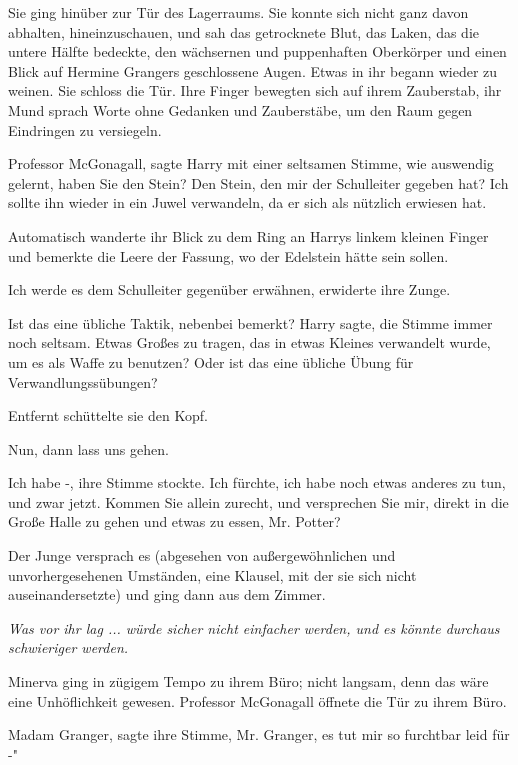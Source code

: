 Sie ging hinüber zur Tür des Lagerraums. Sie konnte sich nicht ganz davon
abhalten, hineinzuschauen, und sah das getrocknete Blut, das Laken, das die
untere Hälfte bedeckte, den wächsernen und puppenhaften Oberkörper und einen
Blick auf Hermine Grangers geschlossene Augen. Etwas in ihr begann wieder zu
weinen. Sie schloss die Tür. Ihre Finger bewegten sich auf ihrem Zauberstab, ihr
Mund sprach Worte ohne Gedanken und Zauberstäbe, um den Raum gegen Eindringen zu
versiegeln.

\glqq Professor McGonagall\grqq{}, sagte Harry mit einer seltsamen Stimme, wie
auswendig gelernt, \glqq haben Sie den Stein? Den Stein, den mir der Schulleiter
gegeben hat? Ich sollte ihn wieder in ein Juwel verwandeln, da er sich als
nützlich erwiesen hat.\grqq{}

Automatisch wanderte ihr Blick zu dem Ring an Harrys linkem kleinen Finger und
bemerkte die Leere der Fassung, wo der Edelstein hätte sein sollen.

\glqq Ich werde es dem Schulleiter gegenüber erwähnen\grqq{}, erwiderte ihre
Zunge.

\glqq Ist das eine übliche Taktik, nebenbei bemerkt?\grqq{} Harry sagte, die
Stimme immer noch seltsam. \glqq Etwas Großes zu tragen, das in etwas Kleines
verwandelt wurde, um es als Waffe zu benutzen? Oder ist das eine übliche Übung
für Verwandlungssübungen?\grqq{}

Entfernt schüttelte sie den Kopf.

\glqq Nun, dann lass uns gehen.\grqq{}

\glqq Ich habe -\grqq{}, ihre Stimme stockte. \glqq Ich fürchte, ich habe noch
etwas anderes zu tun, und zwar jetzt. Kommen Sie allein zurecht, und versprechen
Sie mir, direkt in die Große Halle zu gehen und etwas zu essen, Mr. Potter?

Der Junge versprach es (abgesehen von außergewöhnlichen und unvorhergesehenen
Umständen, eine Klausel, mit der sie sich nicht auseinandersetzte) und ging dann
aus dem Zimmer.

\emph{Was vor ihr lag ... würde sicher nicht einfacher werden, und es könnte durchaus schwieriger werden.}

Minerva ging in zügigem Tempo zu ihrem Büro; nicht langsam, denn das wäre eine
Unhöflichkeit gewesen. Professor McGonagall öffnete die Tür zu ihrem Büro.

\glqq Madam Granger\grqq{}, sagte ihre Stimme, \glqq Mr. Granger, es tut mir so
furchtbar leid für -"

